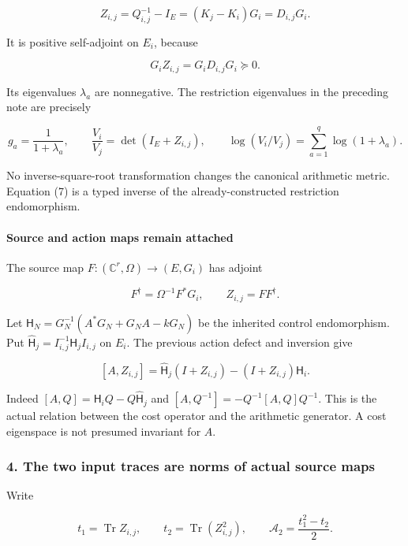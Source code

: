 \[
 \boxed{Z_{i,j}=Q_{i,j}^{-1}-I_E=(K_j-K_i)G_i=D_{i,j}G_i.}       \tag{7}
\]

It is positive self-adjoint on \(E_i\), because

\[
 G_iZ_{i,j}=G_iD_{i,j}G_i\succeq0.
\]

Its eigenvalues \(\lambda_a\) are nonnegative. The restriction eigenvalues in the preceding note are precisely

\[
 g_a=\frac1{1+\lambda_a},\qquad
 \frac{V_i}{V_j}=\det(I_E+Z_{i,j}),\qquad
 \log(V_i/V_j)=\sum_{a=1}^{q}\log(1+\lambda_a).                 \tag{8}
\]

No inverse-square-root transformation changes the canonical arithmetic metric. Equation (7) is a typed inverse of the already-constructed restriction endomorphism.

\paragraph{Source and action maps remain attached}\label{endpoint-relation_moment_original--source-and-action-maps-remain-attached}

The source map \(F:(\mathbb C^r,\Omega)\to(E,G_i)\) has adjoint

\[
 F^{\dagger}=\Omega^{-1}F^*G_i,
 \qquad Z_{i,j}=FF^{\dagger}.                                   \tag{9}
\]

Let \(\mathsf H_N=G_N^{-1}(A^*G_N+G_NA-kG_N)\) be the inherited control endomorphism. Put \(\widehat{\mathsf H}_j=I_{i,j}^{-1}\mathsf H_jI_{i,j}\) on \(E_i\). The previous action defect and inversion give

\[
 \boxed{[A,Z_{i,j}]=
 \widehat{\mathsf H}_j(I+Z_{i,j})-(I+Z_{i,j})\mathsf H_i.}        \tag{10}
\]

Indeed \([A,Q]=\mathsf H_iQ-Q\widehat{\mathsf H}_j\) and \([A,Q^{-1}]=-Q^{-1}[A,Q]Q^{-1}\). This is the actual relation between the cost operator and the arithmetic generator. A cost eigenspace is not presumed invariant for \(A\).

\subsubsection{4. The two input traces are norms of actual source maps}\label{endpoint-relation_moment_original--the-two-input-traces-are-norms-of-actual-source-maps}

Write

\[
 t_1=\operatorname{Tr}Z_{i,j},\qquad
 t_2=\operatorname{Tr}(Z_{i,j}^2),\qquad
 \mathcal A_2=\frac{t_1^2-t_2}{2}.                                      \tag{11}
\]

